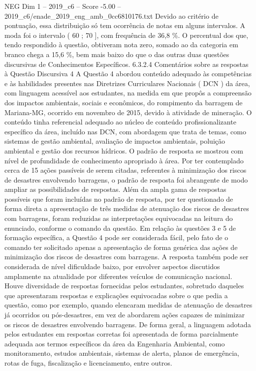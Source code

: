 \begin{textsample}{NEG Dim 1 – 2019\_c6 – Score -5.00 – 2019\_c6/enade\_2019\_eng\_amb\_0cc6810176.txt}
Devido ao critério de pontuação, essa distribuição só tem ocorrência de notas em alguns intervalos.
A moda foi o intervalo ( 60 ; 70 ], com frequência de 36,8 \%.
O percentual dos que, tendo respondido à questão, obtiveram nota zero, somado ao da categoria em branco chega a 15,6 \%, bem mais baixo do que o das outras duas questões discursivas de Conhecimentos Específicos. 6.3.2.4 Comentários sobre as respostas à Questão Discursiva 4 A Questão 4 abordou conteúdo adequado às competências e às habilidades presentes nas Diretrizes Curriculares Nacionais ( DCN ) da área, com linguagem acessível aos estudantes, na medida em que propôs a compreensão dos impactos ambientais, sociais e econômicos, do rompimento da barragem de Mariana-MG, ocorrido em novembro de 2015, devido à atividade de mineração.
O conteúdo tinha referencial adequado ao núcleo de conteúdo profissionalizante específico da área, incluído nas DCN, com abordagem que trata de temas, como sistemas de gestão ambiental, avaliação de impactos ambientais, poluição ambiental e gestão dos recursos hídricos.
O padrão de resposta se mostrou com nível de profundidade de conhecimento apropriado à área.
Por ter contemplado cerca de 15 ações passíveis de serem citadas, referentes à minimização dos riscos de desastres envolvendo barragens, o padrão de resposta foi abrangente de modo ampliar as possibilidades de respostas.
Além da ampla gama de respostas possíveis que foram incluídas no padrão de resposta, por ter questionado de forma direta a apresentação de três medidas de atenuação dos riscos de desastres com barragens, foram reduzidas as interpretações equivocadas na leitura do enunciado, conforme o comando da questão.
Em relação às questões 3 e 5 de formação específica, a Questão 4 pode ser considerada fácil, pelo fato de o comando ter solicitado apenas a apresentação de forma genérica das ações de minimização dos riscos de desastres com barragens.
A resposta também pode ser considerada de nível dificuldade baixo, por envolver aspectos discutidos amplamente na atualidade por diferentes veículos de comunicação nacional.
Houve diversidade de respostas fornecidas pelos estudantes, sobretudo daqueles que apresentaram respostas e explicações equivocadas sobre o que pedia a questão, como por exemplo, quando elencaram medidas de atenuação de desastres já ocorridos ou pós-desastres, em vez de abordarem ações capazes de minimizar os riscos de desastres envolvendo barragens.
De forma geral, a linguagem adotada pelos estudantes em respostas corretas foi apresentada de forma parcialmente adequada aos termos específicos da área da Engenharia Ambiental, como monitoramento, estudos ambientais, sistemas de alerta, planos de emergência, rotas de fuga, fiscalização e licenciamento, entre outros.

\end{textsample}
